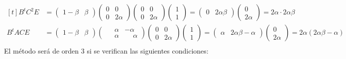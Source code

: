 \documentclass[11pt]{report}
\begin{document}
\begin{enumerate}
\[    \begin{aligned}[t]
    B^tC^2E &= \left(\begin{array}{cc}
        1-\beta & \beta
    \end{array}\right)\left(\begin{array}{cc}
        0 & 0 \\
        0 & 2\alpha
    \end{array}\right)\left(\begin{array}{cc}
        0 & 0 \\
        0 & 2\alpha
    \end{array}\right)\left(\begin{array}{c}
        1 \\
        1
    \end{array}\right) = \left(\begin{array}{cc}
        0 & 2\alpha\beta
    \end{array}\right)\left(\begin{array}{c}
        0 \\
        2\alpha
    \end{array}\right) = 2\alpha \cdot 2\alpha \beta \\
    B^tACE &= \left(\begin{array}{cc}
        1-\beta & \beta
    \end{array}\right)\left(\begin{array}{cc}
        \phantom{-}\alpha & -\alpha \\
        \phantom{-}\alpha & \phantom{-}\alpha 
    \end{array}\right)\left(\begin{array}{cc}
        0 & 0 \\
        0 & 2\alpha
    \end{array}\right)\left(\begin{array}{c}
        1 \\
        1
    \end{array}\right) = \left(\begin{array}{cc}
        \alpha & 2\alpha\beta - \alpha
    \end{array}\right)\left(\begin{array}{c}
        0 \\
        2\alpha
    \end{array}\right) = 2\alpha(2\alpha\beta-\alpha) \\
\end{aligned}
    \]
    El método será de orden $3$ si se verifican las siguientes condiciones:

\end{enumerate}
\end{document}
